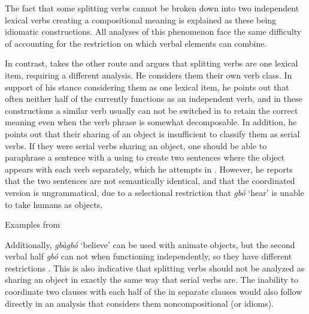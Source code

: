 \documentclass[output=paper,newtxmath,modfonts,nonflat,draftmode]{langsci/langscibook}
\begin{document}
The fact that some splitting verbs cannot be broken down into two independent lexical verbs creating a compositional meaning is explained as these being idiomatic constructions. All analyses of this phenomenon face the same difficulty of accounting for the restriction on which verbal elements can combine.

In contrast, \citet{Awobuluyi1967,Awobuluyi1971} takes the other route and argues that splitting verbs are one lexical item, requiring a different analysis. He considers them their own verb class. In support of his stance considering them as one lexical item, he points out that often neither half of the  currently functions as an independent verb, and in these constructions a similar verb usually can not be switched in to retain the correct meaning even when the verb phrase is somewhat decomposable. In addition, he points out that their sharing of an object is insufficient to classify them as serial verbs. If they were serial verbs sharing an object, one should be able to paraphrase a sentence with a  using  to create two sentences where the object appears with each verb separately, which he attempts in . However, he reports that the two sentences are not semantically identical, and that the coordinated version is ungrammatical, due to a selectional restriction that \textit{gbó} `hear' is unable to take humans as objects.
 
\ea Examples from \citet{Awobuluyi1967} 

	\z
\label{ex:parrish:coordination}
\z 

Additionally, \textit{gbàgbó} `believe' can be used with animate objects, but the second verbal half \textit{gbó} can not when functioning independently, so they have different  restrictions \citep{Awobuluyi1967}. This is also indicative that splitting verbs should not be analyzed as sharing an object in exactly the same way that serial verbs are. The inability to coordinate two clauses with each half of the  in separate clauses would also follow directly in an analysis that considers them noncompositional (or idioms).
\end{document}
